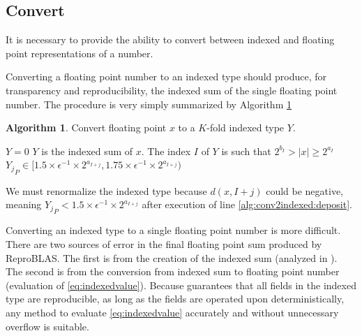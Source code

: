 \documentclass[12pt]{article}
\theoremstyle{definition}
\newtheorem{alg}{Algorithm}[section]
\numberwithin{equation}{section}
\numberwithin{figure}{section}
\begin{document}
  \subsection{Convert}
    \label{sec:primitiveops_convert}
    It is necessary to provide the ability to convert between indexed and floating point representations of a number.

    Converting a floating point number to an indexed type should produce, for transparency and reproducibility, the indexed sum of the single floating point number.
    The procedure is very simply summarized by Algorithm \ref{alg:conv2indexed}

    \begin{samepage}
    \begin{alg}
      Convert floating point $x$ to a $K$-fold indexed type $Y$.
      \begin{algorithmic}[1]
          \State $Y = 0$
          \State {}
          \State {} \label{alg:conv2indexed:deposit}
          \State {}
        \EndFunction
        \Ensure
          $Y$ is the indexed sum of $x$.
          The index $I$ of $Y$ is such that $2^{b_I} > |x| \geq 2^{a_I}$
          ${Y_j}_P \in [1.5 \times \epsilon^{-1}\times 2^{a_{I + j}}, 1.75 \times \epsilon^{-1}\times 2^{a_{I + j}})$
      \end{algorithmic}
      \label{alg:conv2indexed}
    \end{alg}
    \end{samepage}

    We must renormalize the indexed type because $d(x, I + j)$ could be negative, meaning ${Y_j}_P < 1.5 \times \epsilon^{-1}\times 2^{a_{I + j}}$ after execution of line \ref{alg:conv2indexed:deposit}.

    Converting an indexed type to a single floating point number is more difficult. There are two sources of error in the final floating point sum produced by ReproBLAS. The first is from the creation of the indexed sum (analyzed in \cite{repsum}). The second is from the conversion from indexed sum to floating point number (evaluation of  \eqref{eq:indexedvalue}).
    Because \cite{repsum} guarantees that all fields in the indexed type are reproducible, as long as the fields are operated upon deterministically, any method to evaluate  \eqref{eq:indexedvalue} accurately and without unnecessary overflow is suitable.
\end{document}
